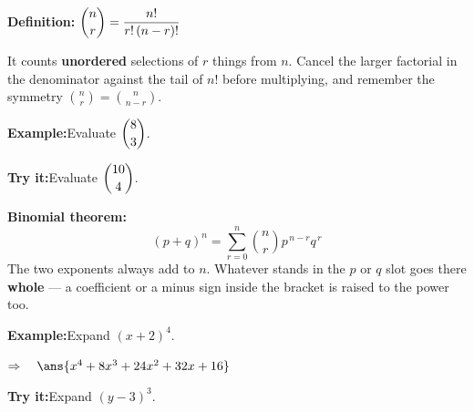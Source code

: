\documentclass[12pt]{article}
\begin{document}


\begin{formulabox}
\textbf{Definition:}\quad
$\dbinom{n}{r} = \dfrac{n!}{r!\,(n-r)!}$\par
\smallskip
It counts \textbf{unordered} selections of $r$ things from $n$. Cancel the
larger factorial in the denominator against the tail of $n!$ before
multiplying, and remember the symmetry $\binom{n}{r} = \binom{n}{n-r}$.
\end{formulabox}

\begin{examplebox}
\textbf{Example:}\quad Evaluate $\dbinom{8}{3}$.
\end{examplebox}

\begin{tryitbox}
\textbf{Try it:}\quad Evaluate $\dbinom{10}{4}$.\\[2pt]
\end{tryitbox}


\begin{formulabox}
\textbf{Binomial theorem:}
\[ (p+q)^{n} = \sum_{r=0}^{n} \binom{n}{r} p^{\,n-r} q^{\,r} \]
The two exponents always add to $n$. Whatever stands in the $p$ or $q$ slot
goes there \textbf{whole} --- a coefficient or a minus sign inside the bracket
is raised to the power too.
\end{formulabox}

\begin{examplebox}
\textbf{Example:}\quad Expand $(x+2)^{4}$.
\par
$\Rightarrow\quad \ans{x^{4}+8x^{3}+24x^{2}+32x+16}$
\end{examplebox}

\begin{tryitbox}
\textbf{Try it:}\quad Expand $(y-3)^{3}$.\\[2pt]
\end{tryitbox}
\end{document}
